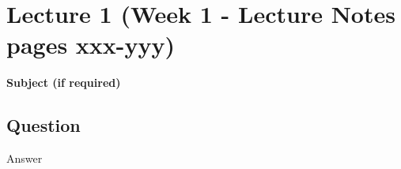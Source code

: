 \newpage


\section{Lecture 1 (Week 1 - {\large Lecture Notes pages xxx-yyy})}

{\bf \Large Subject (if required)}

\subsection{Question}
Answer

